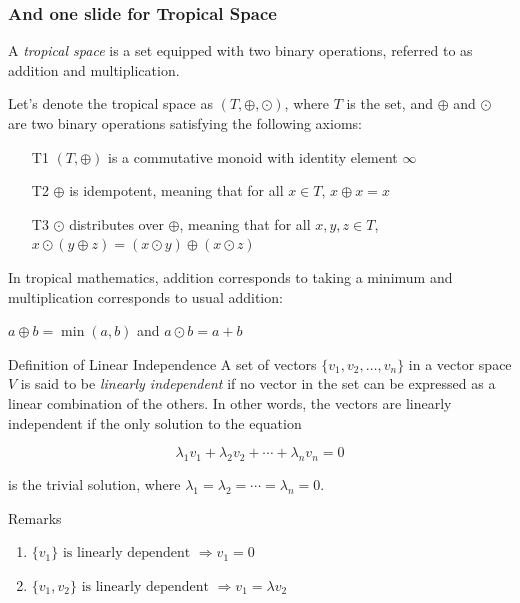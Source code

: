 \documentclass[fullscreen=true, bookmarks=true, hyperref={pdfencoding=unicode}]{beamer}
\begin{document}
\begin{frame}
  \frametitle{And one slide for Tropical Space}
  A \textit{tropical space} is a set equipped with two binary operations, referred to as addition and multiplication. 
  
  Let's denote the tropical space as $(T, \oplus, \odot)$, where $T$ is the set, and $\oplus$ and $\odot$ are two binary operations satisfying the following axioms:
  
  \begin{enumerate}
      \item[T1] $(T, \oplus)$ is a commutative monoid with identity element $\infty$
      \item[T2] $\oplus$ is idempotent, meaning that for all $x \in T$, $x \oplus x = x$
      \item[T3] $\odot$ distributes over $\oplus$, meaning that for all $x, y, z \in T$, $x \odot (y \oplus z) = (x \odot y) \oplus (x \odot z)$
  \end{enumerate}
  
  \vspace{1cm}
  In tropical mathematics, addition corresponds to taking a minimum and multiplication corresponds to usual addition:
  
  $a \oplus b = \min(a,b)$ and $a \odot b = a + b$
  
\end{frame}
  

\begin{frame}{Definition of Linear Independence}
  A set of vectors $\{v_1, v_2, \ldots, v_n\}$ in a vector space $V$ is said to be \emph{linearly independent} if no vector in the set can be expressed as a linear combination of the others. In other words, the vectors are linearly independent if the only solution to the equation
  
  \[
  \lambda_1v_1 + \lambda_2v_2 + \cdots + \lambda_nv_n = 0
  \]
  
  is the trivial solution, where $\lambda_1 = \lambda_2 = \cdots = \lambda_n = 0$.

  \pause\vspace{0.5cm}
  \begin{block}{Remarks}
    \begin{enumerate}
      \item $\{v_1\} \text{ is linearly dependent } \Rightarrow v_1 = 0$
      \item $\{v_1, v_2\} \text{ is linearly dependent } \Rightarrow v_1 = \lambda v_2$
    \end{enumerate}
  \end{block}
\end{frame}
\end{document}
